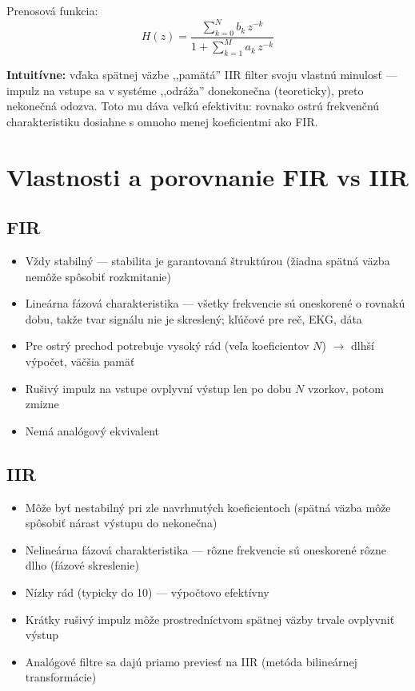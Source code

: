 Prenosová funkcia:
\[
  H(z) = \frac{\displaystyle\sum_{k=0}^{N} b_k\, z^{-k}}
              {1 + \displaystyle\sum_{k=1}^{M} a_k\, z^{-k}}
\]

\textbf{Intuitívne:} vďaka spätnej väzbe ,,pamätá'' IIR filter svoju vlastnú
minulosť --- impulz na vstupe sa v systéme ,,odráža'' donekonečna (teoreticky),
preto nekonečná odozva. Toto mu dáva veľkú efektivitu: rovnako ostrú
frekvenčnú charakteristiku dosiahne s omnoho menej koeficientmi ako FIR.



\section{Vlastnosti a porovnanie FIR vs IIR}

\subsection*{FIR}
\begin{itemize}
  \item Vždy stabilný --- stabilita je garantovaná štruktúrou (žiadna spätná
        väzba nemôže spôsobiť rozkmitanie)
  \item Lineárna fázová charakteristika --- všetky frekvencie sú oneskorené
        o rovnakú dobu, takže tvar signálu nie je skreslený; kľúčové pre reč,
        EKG, dáta
  \item Pre ostrý prechod potrebuje vysoký rád (veľa koeficientov $N$)
        $\to$ dlhší výpočet, väčšia pamäť
  \item Rušivý impulz na vstupe ovplyvní výstup len po dobu $N$ vzorkov,
        potom zmizne
  \item Nemá analógový ekvivalent
\end{itemize}

\subsection*{IIR}
\begin{itemize}
  \item Môže byť nestabilný pri zle navrhnutých koeficientoch (spätná väzba
        môže spôsobiť nárast výstupu do nekonečna)
  \item Nelineárna fázová charakteristika --- rôzne frekvencie sú oneskorené
        rôzne dlho (fázové skreslenie)
  \item Nízky rád (typicky do 10) --- výpočtovo efektívny
  \item Krátky rušivý impulz môže prostredníctvom spätnej väzby trvale
        ovplyvniť výstup
  \item Analógové filtre sa dajú priamo previesť na IIR
        (metóda bilineárnej transformácie)
\end{itemize}

